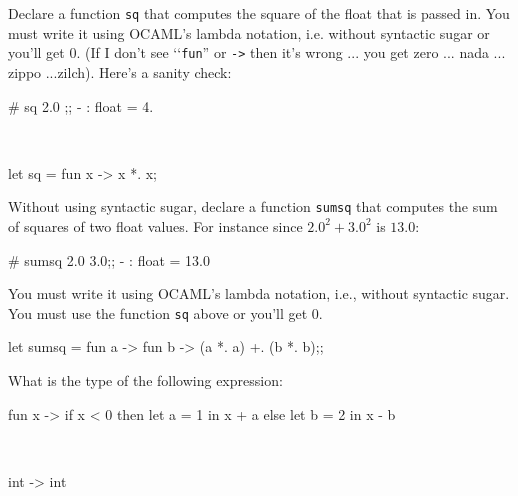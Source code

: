 

\renewcommand\AUTHOR{nweadick1@cougars.ccis.edu} %


\topmattertwo

\nextq
Declare a function
\verb!sq! that computes the square of the float that is passed in.
You must write it using OCAML's lambda notation,
i.e. without syntactic sugar or you'll get 0.
(If I don't see \lq\lq \verb!fun!'' or \verb!->! then it's wrong ...
you get zero ... nada ... zippo ...zilch). Here's a sanity check:
\begin{console}
# sq 2.0 ;;
- : float = 4.
\end{console}
\\
\ANSWER
\begin{answercode}
let sq = fun x -> x *. x;
\end{answercode}

\nextq
Without using syntactic sugar,
declare a function \verb!sumsq! that computes the sum of squares of two float
values.
For instance since $2.0^2 + 3.0^2$ is $13.0$:
\begin{console}
# sumsq 2.0 3.0;;
- : float = 13.0
\end{console}
You must write it using OCAML's lambda notation, i.e., without syntactic sugar.
You must use the function \verb!sq! above or you'll get 0.
\\
\ANSWER
\begin{answercode}
let sumsq = fun a -> fun b -> (a *. a) +. (b *. b);;
\end{answercode}


\nextq
What is the type of the following expression:
\begin{console}
fun x -> if x < 0 then let a = 1 in x + a else let b = 2 in x - b
\end{console}
\\
\ANSWER
\begin{answercode}
int -> int
\end{answercode}

\newpage




